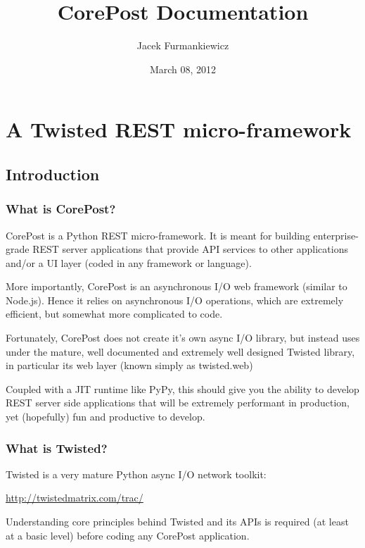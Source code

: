 \documentclass[letterpaper,10pt,english]{sphinxmanual}
\title{CorePost Documentation}
\date{March 08, 2012}
\author{Jacek Furmankiewicz}
\begin{document}
\maketitle
\tableofcontents
{}\label{index::doc}



\chapter{A Twisted REST micro-framework}
\label{index:a-twisted-rest-micro-framework}\label{index:corepost}

\section{Introduction}
\label{intro:introduction}\label{intro::doc}

\subsection{What is CorePost?}
\label{intro:what-is-corepost}
CorePost is a Python REST micro-framework. It is meant for building enterprise-grade REST server applications that provide
API services to other applications and/or a UI layer (coded in any framework or language).

More importantly, CorePost is an asynchronous I/O web framework (similar to Node.js).
Hence it relies on asynchronous I/O operations, which are extremely efficient, but somewhat more complicated to code.

Fortunately, CorePost does not create it's own async I/O library, but instead uses under the mature, well documented
and extremely well designed Twisted library, in particular its web layer (known simply as twisted.web)

Coupled with a JIT runtime like PyPy, this should give you the ability to develop REST server side applications
that will be extremely performant in production, yet (hopefully) fun and productive to develop.


\subsection{What is Twisted?}
\label{intro:what-is-twisted}
Twisted is a very mature Python async I/O network toolkit:

\href{http://twistedmatrix.com/trac/}{http://twistedmatrix.com/trac/}

Understanding core principles behind Twisted and its APIs is required (at least at a basic level) before coding any CorePost application.
\end{document}
